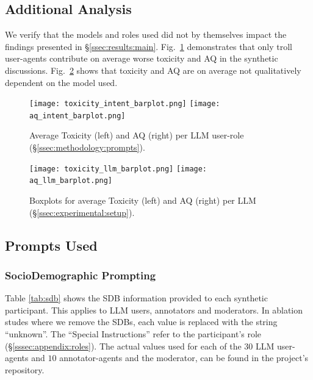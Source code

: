 \subsection{Additional Analysis}

We verify that the models and roles used did not by themselves impact the findings presented in \S\ref{ssec:results:main}. Fig.~\ref{fig:toxicity_aq_role} demonstrates that only troll user-agents contribute on average worse toxicity and \ac{AQ} in the synthetic discussions. Fig.~\ref{fig:toxicity_aq_model} shows that toxicity and \ac{AQ} are on average not qualitatively dependent on the model used.

\begin{figure}
	\texttt{[image: toxicity\_intent\_barplot.png]} \hfill
	\texttt{[image: aq\_intent\_barplot.png]}
	\centering
	\caption{Average Toxicity (left) and \acf{AQ} (right) per \ac{LLM} user-role (\S\ref{ssec:methodology:prompts}).}
	\label{fig:toxicity_aq_role}
\end{figure}

\begin{figure}
	\texttt{[image: toxicity\_llm\_barplot.png]} \hfill
	\texttt{[image: aq\_llm\_barplot.png]}
	\centering
	\caption{Boxplots for average Toxicity (left) and \acf{AQ} (right) per \ac{LLM} (\S\ref{ssec:experimental:setup}).}
	\label{fig:toxicity_aq_model}
\end{figure}


\subsection{Prompts Used}
\label{ssec:appendix:prompts}


\subsubsection{SocioDemographic Prompting}
\label{sssec:appendix:sdbs}

Table \ref{tab:sdb} shows the \ac{SDB} information provided to each synthetic participant. This applies to \ac{LLM} users, annotators and moderators. In ablation studes where we remove the \acp{SDB}, each value is replaced with the string “unknown”. The “Special Instructions” refer to the participant's role (\S\ref{sssec:appendix:roles}). The actual values used for each of the $30$ \ac{LLM} user-agents and $10$ annotator-agents and the moderator, can be found in the project's repository\analysislink.

